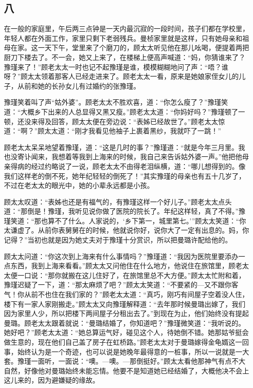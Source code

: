 \subsection{八}

\par 在一般的家庭里，午后两三点钟是一天内最沉寂的一段时间，孩子们都在学校里，年轻人都在外面工作，家里只剩下老弱残兵。曼桢家里就是这样，只有她母亲和祖母在家。这一天下午，堂里来了个磨刀的，顾太太听见他在那儿吆喝，便提着两把厨刀下楼去了。不一会，她又上来了，在楼梯上便高声喊道：“妈，你猜谁来了？豫瑾来了！”顾老太太一时也记不起豫瑾是谁，模模糊糊地问了声：“唔？谁呀？”顾太太领着那客人已经走进来了。顾老太太一看，原来是她娘家侄女儿的儿子，从前和她的长孙女儿有过婚约的张豫瑾。
\par 豫瑾笑着叫了声“姑外婆”。顾老太太不胜欢喜，道：“你怎么瘦了？”豫瑾笑道：“大概乡下出来的人总显得又黑又瘦。”顾老太太道：“你妈好吗？”豫瑾顿了一顿，还没来得及回答，顾太太便在旁边说：“表姊已经故世了。”顾老太太惊道：“啊？”顾太太道：“刚才我看见他袖子上裹着黑纱，我就吓了一跳！”
\par 顾老太太呆呆地望着豫瑾，道：“这是几时的事？”豫瑾道：“就是今年三月里。我也没寄讣闻来，我想着等我到上海来的时候，我自己来告诉姑外婆一声。”他把他母亲得病的经过约略说了一说，顾老太太不由得老泪纵横，道：“哪儿想得到的。像我们这样老的倒不死，她年纪轻轻的倒死了！”其实豫瑾的母亲也有五十几岁了，不过在老太太的眼光中，她的小辈永远都是小孩。
\par 顾太太叹道：“表姊也还是有福气的，有豫瑾这样一个好儿子。”顾老太太点头道：“那倒是！豫瑾，我听见说你做了医院的院长了。年纪这样轻，真了不得。”豫瑾笑道：“那也算不了什么。人家说的，‘乡下第一，城里第七。’”顾太太笑道：“你太谦虚了。从前你表舅舅在的时候，他就说你好，说你大了一定有出息的。妈，你记得？”当初也就是因为她丈夫对于豫瑾十分赏识，所以把曼璐许配给他的。
\par 顾太太问道：“你这次到上海来有什么事情吗？”豫瑾道：“我因为医院里要添办一点东西，我到上海来看看。”顾太太又问他住在什么地方，他说住在旅馆里，顾老太太便一口说：“那你就搬在这儿住好了，在旅馆里总不大方便。”顾太太忙附和着，豫瑾迟疑了一下，道：“那太麻烦了吧？”顾太太笑道：“不要紧的—又不跟你客气！你从前不也住在我们家的？”顾老太太道：“真巧，刚巧有间屋子空着没人住，楼下有一家人家刚搬走。”顾太太又向豫瑾解释道：“去年那时候曼璐出嫁了，我们因为家里人少，所以把楼下两间屋子分租出去了。”到现在为止，他们始终没有提起曼璐。顾老太太跟着就说：“曼璐结婚了，你知道吧？”豫瑾微笑道：“我听说的。她好吧？”顾老太太道：“她总算运气好，碰见这个人，待她倒不错。她那姑爷挺会做生意的，现在他们自己盖了房子在虹桥路。”顾老太太对于曼璐嫁得金龟婿这一回事，始终认为是一个奇迹，也可以说是她晚年最得意的一桩事，所以一说就是一大套。豫瑾一面听，一面说：“噢。—噢。—那倒挺好。”顾太太看他那神气有点不大自然，好像他对曼璐始终未能忘情。他要不是知道她已经结婚了，大概他决不会上这儿来的，因为避嫌疑的缘故。
